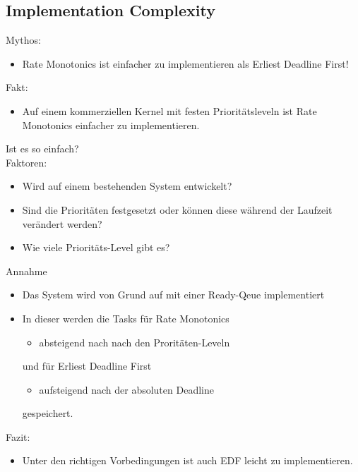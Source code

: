 \subsection{Implementation Complexity}\label{ImplementationComplexity}
\begin{frame}{\subsecname}
	Mythos:
	\begin{itemize}
		\item Rate Monotonics ist einfacher zu implementieren als Erliest Deadline First!
	\end{itemize}
\end{frame}

\begin{frame}{\subsecname}
	Fakt:
	\begin{itemize}
		\item Auf einem kommerziellen Kernel mit festen Prioritätsleveln ist Rate Monotonics einfacher zu implementieren.
	\end{itemize}
	Ist es so einfach?\\\pause
	Faktoren:
	\begin{itemize}
		\item Wird auf einem bestehenden System entwickelt?
		\item Sind die Prioritäten festgesetzt oder können diese während der Laufzeit verändert werden?
		\item Wie viele Prioritäts-Level gibt es?
	\end{itemize}
\end{frame}

\begin{frame}{\subsecname}
	Annahme
	\begin{itemize}
		\item Das System wird von Grund auf mit einer Ready-Qeue implementiert\pause
		\item In dieser werden die Tasks für Rate Monotonics
			\begin{itemize}
				\item absteigend nach nach den Proritäten-Leveln
			\end{itemize}
			und für Erliest Deadline First
			\begin{itemize}
				\item aufsteigend nach der absoluten Deadline
			\end{itemize} gespeichert.
	\end{itemize}
\end{frame}

\begin{frame}{\subsecname}
	Fazit:
	\begin{itemize}
		\item Unter den richtigen Vorbedingungen ist auch EDF leicht zu implementieren.
	\end{itemize}
\end{frame}

